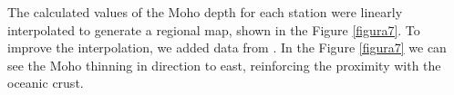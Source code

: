 The calculated values of the Moho depth for each station were linearly interpolated to generate a regional map, shown in the Figure \ref{figura7}. To improve the interpolation, we added data from \citep{assumpcao_crustal_2013}. In the Figure \ref{figura7} we can see the Moho thinning in direction to east, reinforcing the proximity with the oceanic crust.

